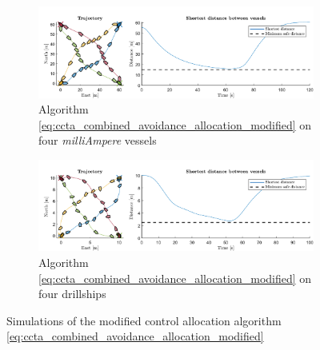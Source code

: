 \begin{figure}[t]
    \centering
    \begin{subfigure}{0.8\linewidth}
        \centering
        \includegraphics[width = \textwidth]{figures/ccta/milliAmpere_modified.pdf}
        \caption{Algorithm \eqref{eq:ccta_combined_avoidance_allocation_modified} on four \emph{milliAmpere} vessels}
        \vspace*{1em}
    \end{subfigure}
    \begin{subfigure}{0.8\linewidth}
        \centering
        \includegraphics[width = \textwidth]{figures/ccta/drillship_modified.pdf}
        \caption{Algorithm \eqref{eq:ccta_combined_avoidance_allocation_modified} on four drillships}
    \end{subfigure}
    \caption{Simulations of the modified control allocation algorithm \eqref{eq:ccta_combined_avoidance_allocation_modified}}
    \label{fig:ccta_modified}
\end{figure}

